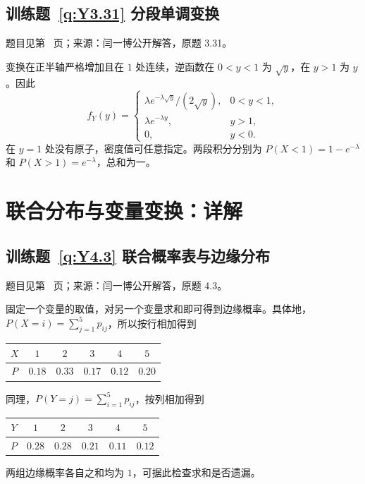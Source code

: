 \documentclass[UTF8,12pt,a4paper,fontset=fandol]{ctexbook}
\begin{document}
\subsection*{训练题~\ref{q:Y3.31} 分段单调变换}\label{a:Y3.31}{\small 题目见第~\pageref{q:Y3.31} 页；来源：闫一博公开解答，原题 3.31。}
\begin{solve}变换在正半轴严格增加且在 $1$ 处连续，逆函数在 $0<y<1$ 为 $\sqrt y$，在 $y>1$ 为 $y$。因此\[f_Y(y)=\begin{cases}\lambda e^{-\lambda\sqrt y}/(2\sqrt y),&0<y<1,\\\lambda e^{-\lambda y},&y>1,\\0,&y<0.\end{cases}\]在 $y=1$ 处没有原子，密度值可任意指定。两段积分分别为 $P(X<1)=1-e^{-\lambda}$ 和 $P(X>1)=e^{-\lambda}$，总和为一。\end{solve}

\clearpage\section*{联合分布与变量变换：详解}

\subsection*{训练题~\ref{q:Y4.3} 联合概率表与边缘分布}\label{a:Y4.3}{\small 题目见第~\pageref{q:Y4.3} 页；来源：闫一博公开解答，原题 4.3。}
\begin{solve}固定一个变量的取值，对另一个变量求和即可得到边缘概率。具体地，$P(X=i)=\sum_{j=1}^5p_{ij}$，所以按行相加得到
\begin{center}
    
    \begin{tabular}{|c|c|c|c|c|c|} \hline 
         $X$&  $1$& $2$&$3$& $4$&$5$\\ \hline 
         $P$& 
     $0.18$& $0.33$& $0.17$& $0.12$&$0.20$\\ \hline\end{tabular}

\end{center}
同理，$P(Y=j)=\sum_{i=1}^5p_{ij}$，按列相加得到\begin{center}
    
    \begin{tabular}{|c|c|c|c|c|c|} \hline 
         $Y$&  $1$& $2$&$3$& $4$&$5$\\ \hline 
         $P$& 
     $0.28$& $0.28$& $0.21$& $0.11$&$0.12$\\ \hline\end{tabular}

\end{center}

两组边缘概率各自之和均为 $1$，可据此检查求和是否遗漏。\end{solve}
\end{document}
